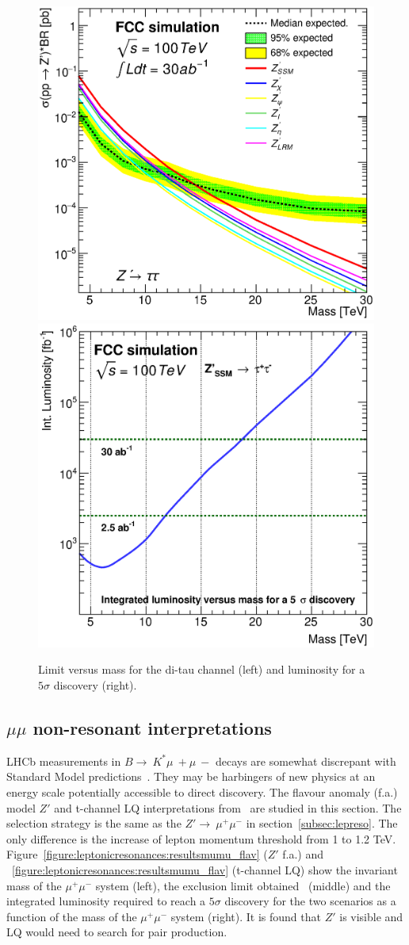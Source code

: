 \begin{figure}[!htb]
  \centering
  \includegraphics[width=0.33\columnwidth]{Fig/lim_Zprime_tautau_fcc_v02_allxs.eps}
  \includegraphics[width=0.33\columnwidth]{Fig/DiscoveryPotential_tautau_rootStyle.eps}
  \caption{Limit versus mass for the di-tau channel (left) and luminosity for a $5\sigma$ discovery (right). }
  \label{figure:leptonicresonances:resultstautau}
\end{figure}


\subsection{\texorpdfstring{$\mu\mu$}{uu} non-resonant interpretations}
LHCb measurements in $B\rightarrow~K^*\mu~+\mu~-$ decays are somewhat discrepant with Standard Model predictions~\cite{Aaij:2014ora,Aaij:2017vbb}. They may be harbingers of new physics at an energy scale potentially accessible to direct discovery. The flavour anomaly (f.a.) model $Z'$ and t-channel LQ interpretations from~\cite{Allanach:2017bta} are studied in this section.
\newline
The selection strategy is the same as the $Z'\rightarrow~\mu^+\mu^-$ in section~\ref{subsec:lepreso}. The only difference is the increase of lepton momentum threshold from 1 to 1.2 TeV.
\newline
Figure~\ref{figure:leptonicresonances:resultsmumu_flav} ($Z'$ f.a.) and ~\ref{figure:leptonicresonances:resultsmumu_flav} (t-channel LQ) show the invariant mass of the $\mu^+\mu^-$ system (left), the exclusion limit obtained \intlumifcc\ (middle) and the integrated luminosity required to reach a $5\sigma$ discovery for the two scenarios as a function of the mass of the $\mu^+\mu^-$ system (right).
It is found that $Z'$ is visible and LQ would need to search for pair production.

